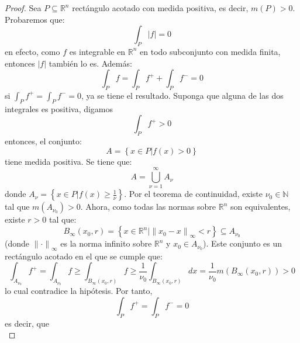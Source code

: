 \documentclass[12pt]{report}
\newcounter{it}
\theoremstyle{largebreak}
\newcommand\abs[1]{\ensuremath{\big|#1\big|}}
\newcommand\norm[1]{\ensuremath{\|#1\|}}
\begin{document}
    \begin{proof}
        Sea $P\subseteq\mathbb{R}^n$ rectángulo acotado con medida positiva, es decir, $m(P)>0$. Probaremos que:
        \begin{equation*}
            \int_P\abs{f}=0
        \end{equation*}
        en efecto, como $f$ es integrable en $\mathbb{R}^n$ en todo subconjunto con medida finita, entonces $\abs{f}$ también lo es. Además:
        \begin{equation*}
            \int_P f=\int_{P}f^++\int_{P}f^-=0
        \end{equation*}
        si $\int_{P}f^+=\int_{P}f^-=0$, ya se tiene el resultado. Suponga que alguna de las dos integrales es positiva, digamos
        \begin{equation*}
            \int_{P}f^+>0
        \end{equation*}
        entonces, el conjunto:
        \begin{equation*}
            A=\left\{x\in P\Big|f(x)>0 \right\}
        \end{equation*}
        tiene medida positiva. Se tiene que:
        \begin{equation*}
            A=\bigcup_{ \nu=1}^\infty A_\nu
        \end{equation*}
        donde $A_\nu=\left\{x\in P\Big|f(x)\geq\frac{1}{\nu}\right\}$. Por el teorema de continuidad, existe $\nu_0\in\mathbb{N}$ tal que $m(A_{\nu_0})>0$. Ahora, como todas las normas sobre $\mathbb{R}^n$ son equivalentes, existe $r>0$ tal que:
        \begin{equation*}
            B_\infty(x_0,r)=\left\{x\in\mathbb{R}^n\Big|\norm{x_0-x}_{\infty}<r \right\}\subseteq A_{\nu_0}
        \end{equation*}
        (donde $\norm{\cdot}_{\infty}$ es la norma infinito sobre $\mathbb{R}^n$ y $x_0\in A_{\nu_0}$). Este conjunto es un rectángulo acotado en el que se cumple que:
        \begin{equation*}
            \int_{A_{\nu_0}} f^+=\int_{A_{\nu_0}} f\geq \int_{B_\infty(x_0,r)}f\geq \frac{1}{\nu_0}\int_{B_\infty(x_0,r)}dx=\frac{1}{\nu_0}m(B_\infty(x_0,r))>0
        \end{equation*}
        lo cual contradice la hipótesis. Por tanto,
        \begin{equation*}
            \int_{P}f^+=\int_{P}f^-=0
        \end{equation*}
        es decir, que
        \begin{equation*}

\end{equation*}
\end{proof}
\end{document}
